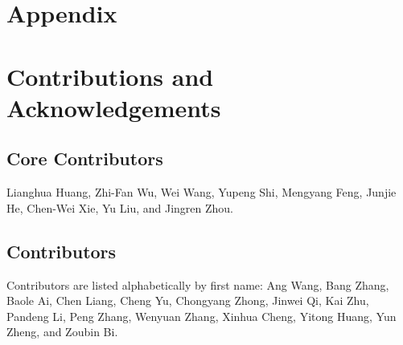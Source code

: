 \documentclass{llmxive}
\begin{document}






\appendix
\section*{Appendix}

\section{Contributions and Acknowledgements}
\label{app:contributions-and-acknowledgements}

\subsection{Core Contributors}
Lianghua Huang, Zhi-Fan Wu, Wei Wang, Yupeng Shi, Mengyang Feng, Junjie He, Chen-Wei Xie, Yu Liu, and Jingren Zhou.

\subsection{Contributors}
Contributors are listed alphabetically by first name: Ang Wang, Bang Zhang, Baole Ai, Chen Liang, Cheng Yu, Chongyang Zhong, Jinwei Qi, Kai Zhu, Pandeng Li, Peng Zhang, Wenyuan Zhang, Xinhua Cheng, Yitong Huang, Yun Zheng, and Zoubin Bi.
\end{document}
